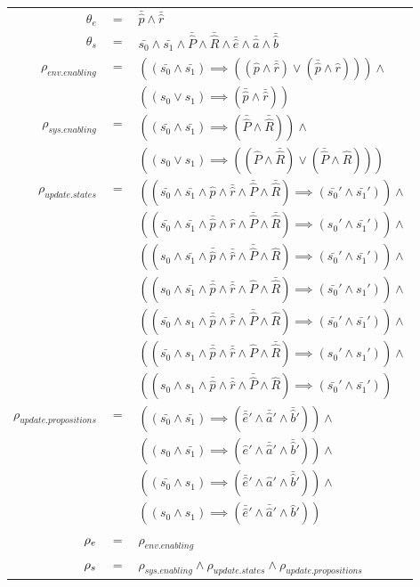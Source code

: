 \footnotesize
\vspace{1em}
\begin{tabular}{ r c l }
	$\theta_{e}$ &$=$& $\bar{\hat{p}} \wedge \bar{\hat{r}}$\\
	$\theta_{s}$ &$=$& $\bar{s_0} \wedge \bar{s_1} \wedge \bar{\hat{P}} \wedge \bar{\hat{R}} \wedge \bar{\hat{e}} \wedge \bar{\hat{a}} \wedge \bar{\hat{b}}$\\	
	$\rho_{env.enabling}$ &$=$& $((\bar{s_0} \wedge \bar{s_1} ) \implies ((\hat{p} \wedge \bar{\hat{r}}) \vee (\bar{\hat{p}} \wedge \hat{r}))) \wedge$\\
	&& $((s_0 \vee s_1 ) \implies (\bar{\hat{p}} \wedge \bar{\hat{r}}))$\\	
	$\rho_{sys.enabling}$ &$=$& $((\bar{s_0} \wedge \bar{s_1} ) \implies (\bar{\hat{P}} \wedge \bar{\hat{R}})) \wedge$\\
	&& $((s_0 \vee s_1 ) \implies ((\hat{P} \wedge \bar{\hat{R}}) \vee (\bar{\hat{P}} \wedge  \hat{R})))$\\		
	$\rho_{update.states}$ &$=$& $((\bar{s_0} \wedge \bar{s_1} \wedge \hat{p} \wedge \bar{\hat{r}} \wedge \bar{\hat{P}} \wedge \bar{\hat{R}}) \implies (\bar{s_0}' \wedge \bar{s_1}')) \wedge$\\
	&&$((\bar{s_0} \wedge \bar{s_1} \wedge \bar{\hat{p}} \wedge \hat{r} \wedge \bar{\hat{P}} \wedge \bar{\hat{R}}) \implies (s_0' \wedge \bar{s_1}')) \wedge$\\	
	&&$((s_0 \wedge \bar{s_1} \wedge \bar{\hat{p}} \wedge \bar{\hat{r}} \wedge \bar{\hat{P}} \wedge \hat{R}) \implies (\bar{s_0}' \wedge \bar{s_1}')) \wedge$\\	
	&&$((s_0 \wedge \bar{s_1} \wedge \bar{\hat{p}} \wedge \bar{\hat{r}} \wedge \hat{P} \wedge \bar{\hat{R}}) \implies (\bar{s_0}' \wedge s_1')) \wedge$\\	
	&&$((\bar{s_0} \wedge s_1 \wedge \bar{\hat{p}} \wedge \bar{\hat{r}} \wedge \bar{\hat{P}} \wedge \hat{R}) \implies (\bar{s_0}' \wedge \bar{s_1}')) \wedge$\\		
	&&$((\bar{s_0} \wedge s_1 \wedge \bar{\hat{p}} \wedge \bar{\hat{r}} \wedge \hat{P} \wedge \bar{\hat{R}}) \implies (s_0' \wedge s_1')) \wedge$\\		
	&&$((s_0 \wedge s_1 \wedge \bar{\hat{p}} \wedge \bar{\hat{r}} \wedge \bar{\hat{P}} \wedge \hat{R}) \implies (\bar{s_0}' \wedge \bar{s_1}'))$\\	
	$\rho_{update.propositions}$ &$=$& $((\bar{s_0} \wedge \bar{s_1}) \implies (\bar{\hat{e}}' \wedge \bar{\hat{a}}' \wedge \bar{\hat{b}}')) \wedge$\\
	&& $((s_0 \wedge \bar{s_1}) \implies (\hat{e}' \wedge \bar{\hat{a}}' \wedge \bar{\hat{b}}')) \wedge$\\
	&& $((\bar{s_0} \wedge s_1) \implies (\bar{\hat{e}}' \wedge \hat{a}' \wedge \bar{\hat{b}}')) \wedge$\\
	&& $((s_0 \wedge s_1) \implies (\bar{\hat{e}}' \wedge \bar{\hat{a}}' \wedge \hat{b}'))$\\	
	${\rho_e}$&$=$&$\rho_{env.enabling}$\\		
	${\rho_s}$&$=$&$\rho_{sys.enabling} \wedge  \rho_{update.states} \wedge  \rho_{update.propositions}$\\	
\end{tabular}

